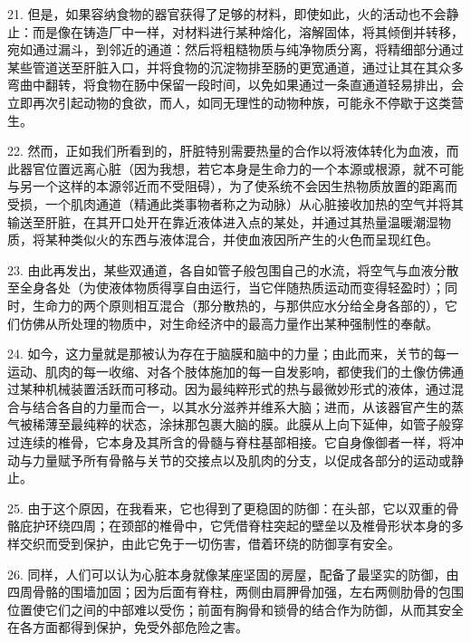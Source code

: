21. 但是，如果容纳食物的器官获得了足够的材料，即使如此，火的活动也不会静止：而是像在铸造厂中一样，对材料进行某种熔化，溶解固体，将其倾倒并转移，宛如通过漏斗，到邻近的通道：然后将粗糙物质与纯净物质分离，将精细部分通过某些管道送至肝脏入口，并将食物的沉淀物排至肠的更宽通道，通过让其在其众多弯曲中翻转，将食物在肠中保留一段时间，以免如果通过一条直通道轻易排出，会立即再次引起动物的食欲，而人，如同无理性的动物种族，可能永不停歇于这类营生。\par

22. 然而，正如我们所看到的，肝脏特别需要热量的合作以将液体转化为血液，而此器官位置远离心脏（因为我想，若它本身是生命力的一个本源或根源，就不可能与另一个这样的本源邻近而不受阻碍），为了使系统不会因生热物质放置的距离而受损，一个肌肉通道（精通此类事物者称之为动脉）从心脏接收加热的空气并将其输送至肝脏，在其开口处开在靠近液体进入点的某处，并通过其热量温暖潮湿物质，将某种类似火的东西与液体混合，并使血液因所产生的火色而呈现红色。\par

23. 由此再发出，某些双通道，各自如管子般包围自己的水流，将空气与血液分散至全身各处（为使液体物质得享自由运行，当它伴随热质运动而变得轻盈时）；同时，生命力的两个原则相互混合（那分散热的，与那供应水分给全身各部的），它们仿佛从所处理的物质中，对生命经济中的最高力量作出某种强制性的奉献。\par

24. 如今，这力量就是那被认为存在于脑膜和脑中的力量；由此而来，关节的每一运动、肌肉的每一收缩、对各个肢体施加的每一自发影响，都使我们的土像仿佛通过某种机械装置活跃而可移动。因为最纯粹形式的热与最微妙形式的液体，通过混合与结合各自的力量而合一，以其水分滋养并维系大脑；进而，从该器官产生的蒸气被稀薄至最纯粹的状态，涂抹那包裹大脑的膜。此膜从上向下延伸，如管子般穿过连续的椎骨，它本身及其所含的骨髓与脊柱基部相接。它自身像御者一样，将冲动与力量赋予所有骨骼与关节的交接点以及肌肉的分支，以促成各部分的运动或静止。\par

25. 由于这个原因，在我看来，它也得到了更稳固的防御：在头部，它以双重的骨骼庇护环绕四周；在颈部的椎骨中，它凭借脊柱突起的壁垒以及椎骨形状本身的多样交织而受到保护，由此它免于一切伤害，借着环绕的防御享有安全。\par

26. 同样，人们可以认为心脏本身就像某座坚固的房屋，配备了最坚实的防御，由四周骨骼的围墙加固；因为后面有脊柱，两侧由肩胛骨加强，左右两侧肋骨的包围位置使它们之间的中部难以受伤；前面有胸骨和锁骨的结合作为防御，从而其安全在各方面都得到保护，免受外部危险之害。\par

